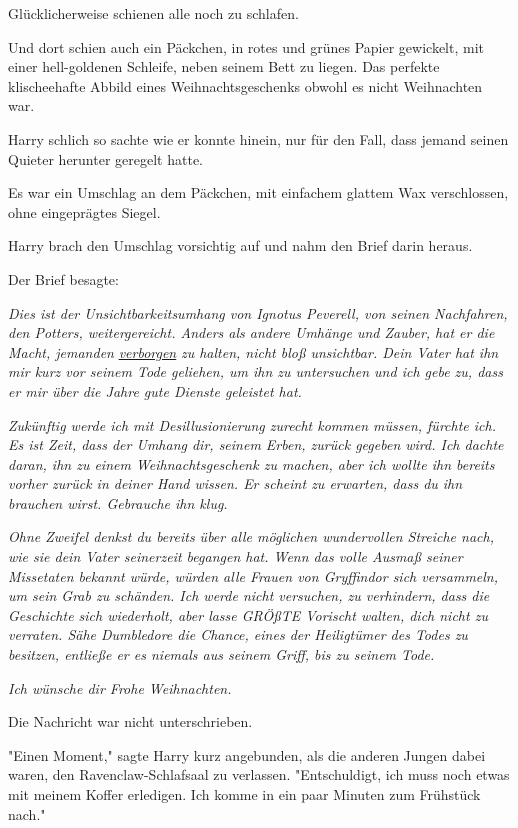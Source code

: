 {Glücklicherweise schienen alle noch zu schlafen.

Und dort schien auch ein Päckchen, in rotes und grünes Papier gewickelt, mit einer hell-goldenen Schleife, neben seinem Bett zu liegen. Das perfekte klischeehafte Abbild eines Weihnachtsgeschenks obwohl es nicht Weihnachten war.

Harry schlich so sachte wie er konnte hinein, nur für den Fall, dass jemand seinen Quieter herunter geregelt hatte.

Es war ein Umschlag an dem Päckchen, mit einfachem glattem Wax verschlossen, ohne eingeprägtes Siegel.

Harry brach den Umschlag vorsichtig auf und nahm den Brief darin heraus.

Der Brief besagte:

\emph{Dies ist der Unsichtbarkeitsumhang von Ignotus Peverell, von seinen Nachfahren, den Potters, weitergereicht. Anders als andere Umhänge und Zauber, hat er die Macht, jemanden} \emph{\uline{verborgen}} \emph{zu halten, nicht bloß unsichtbar. Dein Vater hat ihn mir kurz vor seinem Tode geliehen, um ihn zu untersuchen und ich gebe zu, dass er mir über die Jahre gute Dienste geleistet hat.}

\emph{Zukünftig werde ich mit Desillusionierung zurecht kommen müssen, fürchte ich. Es ist Zeit, dass der Umhang dir, seinem Erben, zurück gegeben wird. Ich dachte daran, ihn zu einem Weihnachtsgeschenk zu machen, aber ich wollte ihn bereits vorher zurück in deiner Hand wissen. Er scheint zu erwarten, dass du ihn brauchen wirst. Gebrauche ihn klug.}

\emph{Ohne Zweifel denkst du bereits über alle möglichen wundervollen Streiche nach, wie sie dein Vater seinerzeit begangen hat. Wenn das volle Ausmaß seiner Missetaten bekannt würde, würden alle Frauen von Gryffindor sich versammeln, um sein Grab zu schänden. Ich werde nicht versuchen, zu verhindern, dass die Geschichte sich wiederholt, aber lasse GRÖßTE Vorischt walten, dich nicht zu verraten. Sähe Dumbledore die Chance, eines der Heiligtümer des Todes zu besitzen, entließe er es niemals aus seinem Griff, bis zu seinem Tode.}

\emph{Ich wünsche dir Frohe Weihnachten.}

Die Nachricht war nicht unterschrieben.

\later

"Einen Moment," sagte Harry kurz angebunden, als die anderen Jungen dabei waren, den Ravenclaw-Schlafsaal zu verlassen. "Entschuldigt, ich muss noch etwas mit meinem Koffer erledigen. Ich komme in ein paar Minuten zum Frühstück nach."

}
